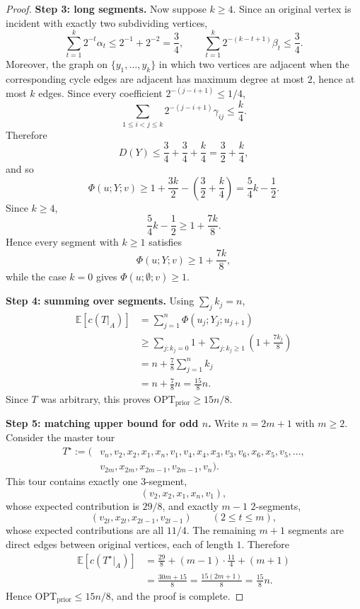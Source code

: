 \documentclass[11pt]{amsart}
\newcommand{\E}{\mathbb{E}}
\newcommand{\optprior}{\mathrm{OPT}_{\mathrm{prior}}}
\begin{document}
\begin{proof}
\medskip
\noindent\textbf{Step 3: long segments.}
Now suppose $k\ge 4$. Since an original vertex is incident with exactly two subdividing vertices,
\[
\sum_{t=1}^k 2^{-t}\alpha_t\le 2^{-1}+2^{-2}=\frac34,
\qquad
\sum_{t=1}^k 2^{-(k-t+1)}\beta_t\le \frac34.
\]
Moreover, the graph on $\{y_1,\dots,y_k\}$ in which two vertices are adjacent when the corresponding cycle edges are adjacent has maximum degree at most $2$, hence at most $k$ edges. Since every coefficient $2^{-(j-i+1)}\le 1/4$,
\[
\sum_{1\le i<j\le k}2^{-(j-i+1)}\gamma_{ij}\le \frac{k}{4}.
\]
Therefore
\[
D(Y)\le \frac34+\frac34+\frac{k}{4}=\frac32+\frac{k}{4},
\]
and so
\[
\Phi(u;Y;v)
\ge
1+\frac{3k}{2}-\left(\frac32+\frac{k}{4}\right)
=
\frac54k-\frac12.
\]
Since $k\ge 4$,
\[
\frac54k-\frac12\ge 1+\frac{7k}{8}.
\]
Hence every segment with $k\ge 1$ satisfies
\[
\Phi(u;Y;v)\ge 1+\frac{7k}{8},
\]
while the case $k=0$ gives $\Phi(u;\emptyset;v)\ge 1$.

\medskip
\noindent\textbf{Step 4: summing over segments.}
Using $\sum_j k_j=n$,
\begin{align*}
\E[c(T|_A)]
&=
\sum_{j=1}^n \Phi(u_j;Y_j;u_{j+1}) \\
&\ge
\sum_{j:k_j=0} 1 + \sum_{j:k_j\ge 1}\left(1+\frac{7k_j}{8}\right) \\
&=
 n + \frac78\sum_{j=1}^n k_j \\
&=
 n+\frac78n
=
\frac{15}{8}n.
\end{align*}
Since $T$ was arbitrary, this proves $\optprior\ge 15n/8$.

\medskip
\noindent\textbf{Step 5: matching upper bound for odd $n$.}
Write $n=2m+1$ with $m\ge 2$. Consider the master tour
\begin{align*}
T^\star:=(&v_n,v_2,x_2,x_1,x_n,v_1,
  v_4,x_4,x_3,v_3,
  v_6,x_6,x_5,v_5,
  \dots, \\
 &v_{2m},x_{2m},x_{2m-1},v_{2m-1},v_n).
\end{align*}
This tour contains exactly one $3$-segment,
\[
(v_2,x_2,x_1,x_n,v_1),
\]
whose expected contribution is $29/8$, and exactly $m-1$ $2$-segments,
\[
(v_{2t},x_{2t},x_{2t-1},v_{2t-1})
\qquad (2\le t\le m),
\]
whose expected contributions are all $11/4$. The remaining $m+1$ segments are direct edges between original vertices, each of length $1$. Therefore
\begin{align*}
\E[c(T^\star|_A)]
&=
\frac{29}{8}+(m-1)\cdot \frac{11}{4}+(m+1) \\
&=
\frac{30m+15}{8}
=
\frac{15(2m+1)}{8}
=
\frac{15}{8}n.
\end{align*}
Hence $\optprior\le 15n/8$, and the proof is complete.
\end{proof}
\end{document}
